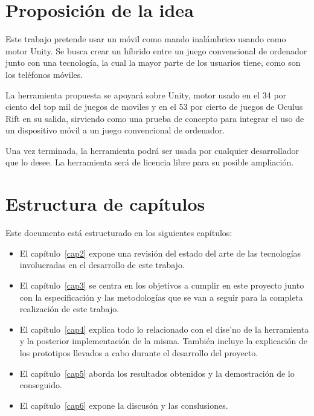 \section{Proposici\'on de la idea}
\label{cap1:sec:porp-idea}

Este trabajo pretende usar un m\'ovil como mando inal\'ambrico usando como motor Unity. Se busca crear un h\'ibrido entre un juego convencional de ordenador
 junto con una tecnolog\'ia, la cual la mayor parte de los usuarios tiene, como son los tel\'efonos m\'oviles.

La herramienta propuesta se apoyar\'a sobre Unity, motor usado en el 34 por ciento del top mil de juegos de moviles y en el 53 por cierto de juegos de Oculus Rift en su salida,
 sirviendo como una prueba de concepto para integrar el uso de un dispositivo m\'ovil a un juego convencional de ordenador.

Una vez terminada,  la herramienta podr\'a ser usada por cualquier desarrollador que lo desee. La herramienta ser\'a de licencia libre para su posible ampliaci\'on. 

\section{Estructura de cap\'itulos}
\label{cap1:sec:estructura}

Este documento est\'a estructurado en los siguientes cap\'itulos:

\begin{itemize}
\item El cap\'itulo~\ref{cap2} expone una revisi\'on del estado del arte de las tecnolog\'ias involucradas en el desarrollo de este trabajo.

\item El cap\'itulo~\ref{cap3} se centra en los objetivos a cumplir en este proyecto junto con la especificaci\'on y las metodolog\'ias que se van a seguir para la completa realizaci\'on de este trabajo.

\item El cap\'itulo~\ref{cap4} explica todo lo relacionado con el dise'no de la herramienta y la posterior implementaci\'on de la misma. Tambi\'en incluye la explicaci\'on de los prototipos llevados a cabo durante el desarrollo del proyecto.

\item El cap\'itulo~\ref{cap5} aborda los resultados obtenidos y la demostraci\'on de lo conseguido.

\item El cap\'itulo~\ref{cap6} expone la discus\'on y las conslusiones.
\end{itemize}

